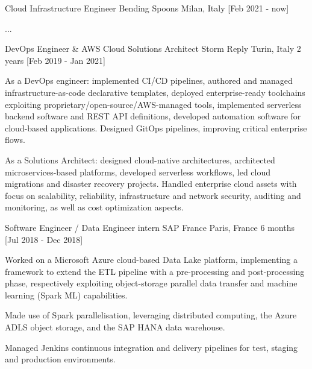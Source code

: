 

\begin{cventries}


  \cventry
    {Cloud Infrastructure Engineer} %
    {Bending Spoons} %
    {Milan, Italy} %
    {[Feb 2021 - now]} %
    {
        \begin{cvitems} %
\item ...
        \end{cvitems}
    }

  \cventry
    {DevOps Engineer \& AWS Cloud Solutions Architect} %
    {Storm Reply} %
    {Turin, Italy} %
    {2 years [Feb 2019 - Jan 2021]} %
    {
        \begin{cvitems} %
\item As a DevOps engineer: implemented CI/CD pipelines, authored and managed infrastructure-as-code declarative templates, deployed enterprise-ready toolchains exploiting proprietary/open-source/AWS-managed tools, implemented serverless backend software and REST API definitions, developed automation software for cloud-based applications. Designed GitOps pipelines, improving critical enterprise flows.
\item As a Solutions Architect: designed cloud-native architectures, architected microservices-based platforms, developed serverless workflows, led cloud migrations and disaster recovery projects. Handled enterprise cloud assets with focus on scalability, reliability, infrastructure and network security, auditing and monitoring, as well as cost optimization aspects.
        \end{cvitems}
    }

  \cventry
    {Software Engineer / Data Engineer intern} %
    {SAP France} %
    {Paris, France} %
    {6 months [Jul 2018 - Dec 2018]} %
    {
      \begin{cvitems} %
\item Worked on a Microsoft Azure cloud-based Data Lake platform, implementing a framework to extend the ETL pipeline with a pre-processing and post-processing phase, respectively exploiting object-storage parallel data transfer and machine learning (Spark ML) capabilities.
\item Made use of Spark parallelisation, leveraging distributed computing, the Azure ADLS object storage, and the SAP HANA data warehouse.
\item Managed Jenkins continuous integration and delivery pipelines for test, staging and production environments.
      \end{cvitems}
    }
\end{cventries}
